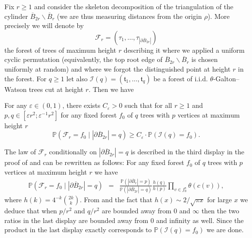 \documentclass[AHL,XML,longabstracts,Unicode,NoSaveZebib]{cedram}
\begin{document}
 Fix $r \geq 1$ and consider the skeleton decomposition of the triangulation of the cylinder $ \overline{B}_{2r} \backslash \overline{B}_{r}$ (we are thus measuring distances from the origin $\rho$). More precisely we will denote by $$ \mathcal{F}_{r} = (\tau_{1}, \dots , \tau_{| \partial \overline{B}_{2r}|})$$ the forest of trees of maximum height $r$ describing it where we applied a uniform cyclic permutation (equivalently, the top root edge of $\overline{B}_{2r} \backslash \overline{B}_{r}$ is chosen uniformly at random) and where we forgot the distinguished point at height $r$ in the forest. For $q \geq 1$ let also $ \mathcal{I}(q) = (  \mathfrak{t}_{1}, \dots , \mathfrak{t}_{q})$ be a forest of i.i.d. $\theta$-Galton--Watson trees cut at height $r$. Then we have
 \begin{lemma} \label{lem:comparison} For any $ \varepsilon \in (0,1)$, there exists $C_{\varepsilon}>0$ such that for all $r\geq 1$ and $ p,q  \in [ \varepsilon r^{2};  \varepsilon^{-1} r^{2}]$ for any fixed forest $f_{0}$ of $q$  trees with $p$ vertices at maximum height $r$
 $$ \mathbb{P}( \mathcal{F}_{r} = f_{0} \mid | \partial \overline{B}_{2r}| = q) \geq C_{\varepsilon} \cdot \mathbb{P}( \mathcal{I}(q) = f_{0}).$$
 \end{lemma}
 \proof The law of $ \mathcal{F}_{r}$ conditionally on $| \partial \overline{B}_{2r}| = q$ is described in the third display in the proof of \cite[Proposition 5]{CLGfpp} and can be rewritten as follows: For any  fixed forest $f_{0}$ of $q$ trees with $p$ vertices at maximum height $r$ we have
 \begin{eqnarray} \mathbb{P}( \mathcal{F}_{r} = f_{0} \mid | \partial \overline{B}_{2r}| = q) &=&  \frac{\mathbb{P}( |\partial \overline{B}_{r}|=p)}{ \mathbb{P}(| \partial \overline{B}_{2r}| = q)} \frac{h(q)}{h(p)} \prod_{v \in f_{0}^{\star}} \theta(c(v)), %
\end{eqnarray}
where $h(k)= 4^{-k}{\binom{2k}{k}}$. From \cite[Remark 3]{CLGfpp} and the fact that $ h(x) \sim 2/ \sqrt{\pi x}$ for large $x$ we deduce that when $p/r^{2}$ and $q/r^{2}$ are bounded away from $0$ and $\infty$ then the two ratios in the last display are bounded away from $0$ and infinity as well. Since the product in the last display exactly corresponds to $\mathbb{P}( \mathcal{I}(q) = f_{0})$ we are done. \endproof
\end{document}
